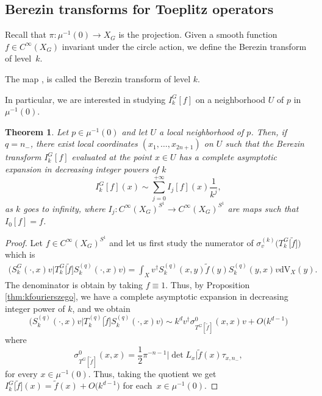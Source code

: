 \documentclass[10pt,a4paper]{amsart}
\numberwithin{equation}{section}
\newtheorem{Theorem}{Theorem}[section]
\newcommand{\abs}[1]{\left\vert#1\right\vert}
\begin{document}
 \subsection{Berezin transforms for Toeplitz operators}
	
	Recall that $\pi\colon \mu^{-1}(0)\rightarrow X_G$ is the projection. Given a smooth function $f\in C^{\infty}(X_G)$ invariant under the circle action, we define the Berezin transform of level~$k$.
	
 \begin{Definition} The map
, 
 		is called the Berezin transform of level $k$.
\end{Definition}

In particular, we are interested in studying $I_k^G[f]$ on a neighborhood $U$ of $p$ in $\mu^{-1}(0)$.
 	
 	\begin{Theorem} \label{thm:main}
 		Let $p\in \mu^{-1}(0)$ and let $U$ a local neighborhood of $p$. Then, if $q= n_-$, there exist local coordinates $(x_1,\dots, x_{2n+1})$ on $U$ such that the Berezin transform $I^{G}_k[f]$ evaluated at the point $x\in U$ has a complete asymptotic expansion in decreasing integer powers of $k$
 		\[I^G_k[f](x)\sim \sum_{j=0}^{+\infty}I_j[f](x) \frac{1}{k^j} , \]
 		as $k$ goes to infinity, where $I_j \colon C^{\infty}(X_G)^{S^1}\rightarrow C^{\infty}(X_G)^{S^1}$ are maps such that $I_0[f]=f$.
 	\end{Theorem}
 		\begin{proof}
 		Let $f\in C^{\infty}(X_G)^{S^1}$ and let us first study the numerator of $\sigma^{(k)}_v\bigl(T^{G}_{k}\big[\widetilde{f}\big]\bigr)$ which is
 		\begin{align*} \bigl(S^{G}_k(\cdot, x) v\big\vert T^{G}_{k}\big[\widetilde{f}\big] S^{(q)}_k(\cdot, x) v\bigr) =\int_X v^{\dagger} S^{(q)}_k(x, y) \widetilde{f}(y) S^{(q)}_k(y, x) v \mathrm{dV}_X(y) .
 		\end{align*}
 		The denominator is obtain by taking $f\equiv 1$. Thus, by Proposition \ref{thm:kfourierszego}, we have a complete asymptotic expansion in decreasing integer power of $k$, and we obtain
 		\[\bigl(S^{(q)}_k(\cdot, x) v\big \vert T^{(q)}_{k}\big[\widetilde{f}\big] S^{(q)}_k(\cdot, x) v\bigr) \sim k^d v^{\dagger}\sigma^{0}_{T^G [\widetilde{f} ]}(x, x) v +O\bigl(k^{d-1}\bigr)\]
 		where
 		\[\sigma^0_{T^G [\widetilde{f} ]}(x,x)=\frac{1}{2}\pi^{-n-1}\abs{\det L_x} \widetilde{f}(x) \tau_{x,n_-} ,\]
 		for every $x\in \mu^{-1}(0)$. Thus, taking the quotient we get
 		$I_k^G\big[\widetilde{f}\big](x)=\widetilde{f}(x)+O\bigl(k^{d-1}\bigr) $
 		for each~${x\in \mu^{-1}(0)}$.
 	\end{proof}
 	
\end{document}
